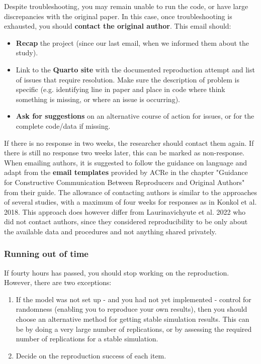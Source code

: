 Despite troubleshooting, you may remain unable to run the code, or have large discrepancies with the original paper. In this case, once troubleshooting is exhausted, you should \textbf{contact the original author}. This email should:
\begin{itemize}
    \item \textbf{Recap} the project (since our last email, when we informed them about the study).
    \item Link to the \textbf{Quarto site} with the documented reproduction attempt and list of issues that require resolution. Make sure the description of problem is specific (e.g. identifying line in paper and place in code where think something is missing, or where an issue is occurring).
    \item \textbf{Ask for suggestions} on an alternative course of action for issues, or for the complete code/data if missing.
\end{itemize}

If there is no response in two weeks, the researcher should contact them again. If there is still no response two weeks later, this can be marked as non-response. When emailing authors, it is suggested to follow the guidance on language and adapt from the \textbf{email templates} provided by ACRe in the chapter "Guidance for Constructive Communication Between Reproducers and Original Authors" from their guide.\autocite{berkeley_initiative_for_transparency_in_the_social_sciences_guide_2022} The allowance of contacting authors is similar to the approaches of several studies,\autocite{krafczyk_learning_2021,wood_push_2018,berkeley_initiative_for_transparency_in_the_social_sciences_guide_2022,hardwicke_analytic_2021,konkol_computational_2019} with a maximum of four weeks for responses as in Konkol et al. 2018\autocite{konkol_computational_2019}. This approach does however differ from Laurinavichyute et al. 2022\autocite{laurinavichyute_share_2022} who did not contact authors, since they considered reproducibility to be only about the available data and procedures and not anything shared privately.\autocite{laurinavichyute_share_2022}

\vspace{0.5cm}
\subsubsection{Running out of time}

If fourty hours has passed, you should stop working on the reproduction. However, there are two exceptions:
\begin{enumerate}
    \item If the model was not set up - and you had not yet implemented - control for randomness (enabling you to reproduce your own results), then you should choose an alternative method for getting stable simulation results. This can be by doing a very large number of replications, or by assessing the required number of replications for a stable simulation.
    \item Decide on the reproduction success of each item.
\end{enumerate}

